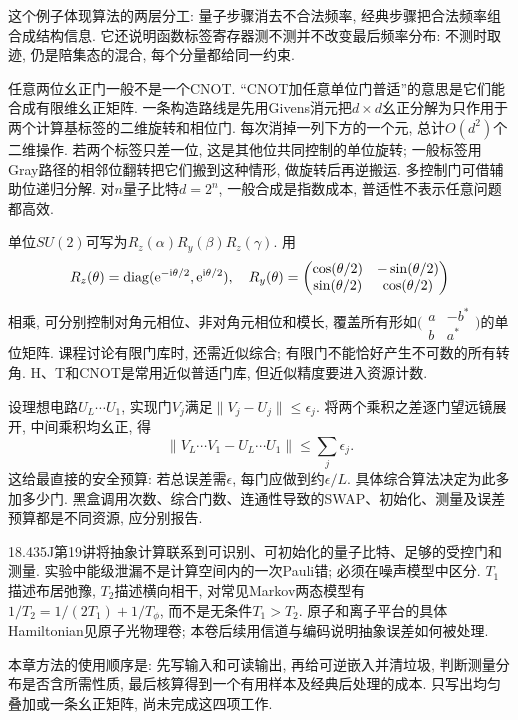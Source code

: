 这个例子体现算法的两层分工: 量子步骤消去不合法频率, 经典步骤把合法频率组合成结构信息. 它还说明函数标签寄存器测不测并不改变最后频率分布: 不测时取迹, 仍是陪集态的混合, 每个分量都给同一约束.

任意两位幺正门一般不是一个CNOT. “CNOT加任意单位门普适”的意思是它们能合成有限维幺正矩阵. 一条构造路线是先用Givens消元把$d\times d$幺正分解为只作用于两个计算基标签的二维旋转和相位门. 每次消掉一列下方的一个元, 总计$O(d^2)$个二维操作. 若两个标签只差一位, 这是其他位共同控制的单位旋转; 一般标签用Gray路径的相邻位翻转把它们搬到这种情形, 做旋转后再逆搬运. 多控制门可借辅助位递归分解. 对$n$量子比特$d=2^n$, 一般合成是指数成本, 普适性不表示任意问题都高效.

单位$SU(2)$可写为$R_z(\alpha)R_y(\beta)R_z(\gamma)$. 用
\[R_z(\theta)=\operatorname{diag}(\mathrm e^{-\mathrm i\theta/2},\mathrm e^{\mathrm i\theta/2}),\quad
R_y(\theta)=\begin{pmatrix}\cos(\theta/2)&-\sin(\theta/2)\\\sin(\theta/2)&\cos(\theta/2)\end{pmatrix}\]
相乘, 可分别控制对角元相位、非对角元相位和模长, 覆盖所有形如$\bigl(\begin{smallmatrix}a&-b^*\\b&a^*\end{smallmatrix}\bigr)$的单位矩阵. 课程讨论有限门库时, 还需近似综合; 有限门不能恰好产生不可数的所有转角. H、T和CNOT是常用近似普适门库, 但近似精度要进入资源计数.

设理想电路$U_L\cdots U_1$, 实现门$V_j$满足$\|V_j-U_j\|\le\epsilon_j$. 将两个乘积之差逐门望远镜展开, 中间乘积均幺正, 得
\[\|V_L\cdots V_1-U_L\cdots U_1\|\le\sum_j\epsilon_j.\]
这给最直接的安全预算: 若总误差需$\epsilon$, 每门应做到约$\epsilon/L$. 具体综合算法决定为此多加多少门. 黑盒调用次数、综合门数、连通性导致的SWAP、初始化、测量及误差预算都是不同资源, 应分别报告.

18.435J第19讲将抽象计算联系到可识别、可初始化的量子比特、足够的受控门和测量. 实验中能级泄漏不是计算空间内的一次Pauli错; 必须在噪声模型中区分. $T_1$描述布居弛豫, $T_2$描述横向相干, 对常见Markov两态模型有$1/T_2=1/(2T_1)+1/T_\phi$, 而不是无条件$T_1>T_2$. 原子和离子平台的具体Hamiltonian见原子光物理卷; 本卷后续用信道与编码说明抽象误差如何被处理.

本章方法的使用顺序是: 先写输入和可读输出, 再给可逆嵌入并清垃圾, 判断测量分布是否含所需性质, 最后核算得到一个有用样本及经典后处理的成本. 只写出均匀叠加或一条幺正矩阵, 尚未完成这四项工作.
